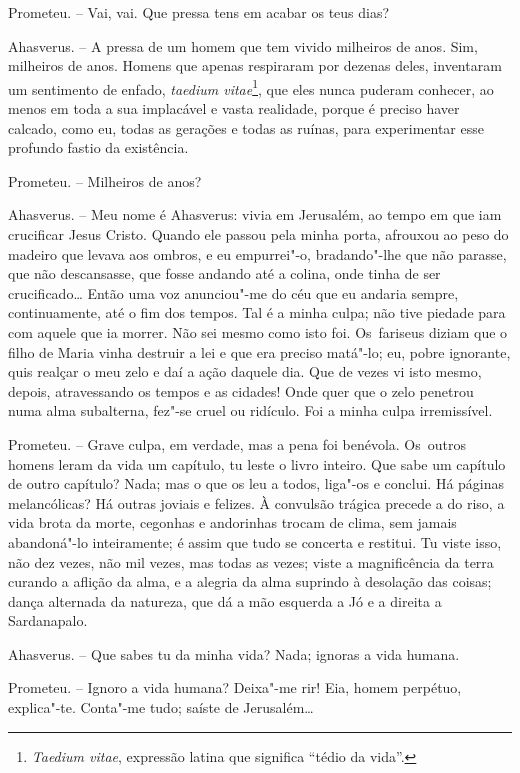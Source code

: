 Prometeu. -- Vai, vai. Que pressa tens em acabar os teus dias?

Ahasverus. -- A pressa de um homem que tem vivido milheiros de anos.
Sim, milheiros de anos. Homens que apenas respiraram por dezenas deles,
inventaram um sentimento de enfado, \emph{taedium vitae}\footnote{\emph{Taedium
  vitae}, expressão latina que significa ``tédio da vida''.}, que eles
nunca puderam conhecer, ao menos em toda a sua implacável e vasta
realidade, porque é preciso haver calcado, como eu, todas as gerações e
todas as ruínas, para experimentar esse profundo fastio da existência.

Prometeu. -- Milheiros de anos?

Ahasverus. -- Meu nome é Ahasverus: vivia em Jerusalém, ao tempo em que
iam crucificar Jesus Cristo. Quando ele passou pela minha porta,
afrouxou ao peso do madeiro que levava aos ombros, e eu empurrei"-o,
bradando"-lhe que não parasse, que não descansasse, que fosse andando até
a colina, onde tinha de ser crucificado\ldots{} Então uma voz anunciou"-me do
céu que eu andaria sempre, continuamente, até o fim dos tempos. Tal é a
minha culpa; não tive piedade para com aquele que ia morrer. Não sei
mesmo como isto foi. Os~fariseus diziam que o filho de Maria vinha
destruir a lei e que era preciso matá"-lo; eu, pobre ignorante, quis
realçar o meu zelo e daí a ação daquele dia. Que de vezes vi isto mesmo,
depois, atravessando os tempos e as cidades! Onde quer que o zelo
penetrou numa alma subalterna, fez"-se cruel ou ridículo. Foi a minha
culpa irremissível.

Prometeu. -- Grave culpa, em verdade, mas a pena foi benévola. Os~outros
homens leram da vida um capítulo, tu leste o livro inteiro. Que sabe um
capítulo de outro capítulo? Nada; mas o que os leu a todos, liga"-os e
conclui. Há páginas melancólicas? Há outras joviais e felizes. À
convulsão trágica precede a do riso, a vida brota da morte, cegonhas e
andorinhas trocam de clima, sem jamais abandoná"-lo inteiramente; é assim
que tudo se concerta e restitui. Tu viste isso, não dez vezes, não mil
vezes, mas todas as vezes; viste a magnificência da terra curando a
aflição da alma, e a alegria da alma suprindo à desolação das coisas;
dança alternada da natureza, que dá a mão esquerda a Jó e a direita a
Sardanapalo.

Ahasverus. -- Que sabes tu da minha vida? Nada; ignoras a vida humana.

Prometeu. -- Ignoro a vida humana? Deixa"-me rir! Eia, homem perpétuo,
explica"-te. Conta"-me tudo; saíste de Jerusalém\ldots{}

